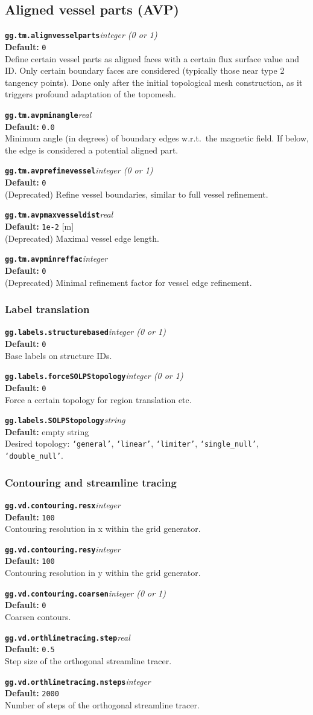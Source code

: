 \documentclass[10pt,a4paper]{article}
\newcommand{\sw}[4]{%
  \par\vspace{0.7em}%
  \begin{minipage}{\linewidth}\raggedright
    \textbf{\texttt{#1}}\hfill\textit{#2}\\[0.1em]
    \textbf{Default:} #3\\[0.1em]
    #4\par
    \vspace{0.3em}{\color{swgrey}\hrule}
  \end{minipage}\par}
\begin{document}
\subsection*{Aligned vessel parts (AVP)}
\sw{gg.tm.alignvesselparts}{integer (0 or 1)}{\texttt{0}}{Define certain vessel parts as aligned faces with a certain flux surface value and ID. Only certain boundary faces are considered (typically those near type 2 tangency points). Done only after the initial topological mesh construction, as it triggers profound adaptation of the topomesh.}
\sw{gg.tm.avpminangle}{real}{\texttt{0.0}}{Minimum angle (in degrees) of boundary edges w.r.t.\ the magnetic field. If below, the edge is considered a potential aligned part.}
\sw{gg.tm.avprefinevessel}{integer (0 or 1)}{\texttt{0}}{(Deprecated) Refine vessel boundaries, similar to full vessel refinement.}
\sw{gg.tm.avpmaxvesseldist}{real}{\texttt{1e-2} [m]}{(Deprecated) Maximal vessel edge length.}
\sw{gg.tm.avpminreffac}{integer}{\texttt{0}}{(Deprecated) Minimal refinement factor for vessel edge refinement.}

\subsubsection*{Label translation}
\sw{gg.labels.structurebased}{integer (0 or 1)}{\texttt{0}}{Base labels on structure IDs.}
\sw{gg.labels.forceSOLPStopology}{integer (0 or 1)}{\texttt{0}}{Force a certain topology for region translation etc.}
\sw{gg.labels.SOLPStopology}{string}{empty string}{Desired topology: \texttt{`general'}, \texttt{`linear'}, \texttt{`limiter'}, \texttt{`single\_null'}, \texttt{`double\_null'}.}

\subsubsection*{Contouring and streamline tracing}
\sw{gg.vd.contouring.resx}{integer}{\texttt{100}}{Contouring resolution in x within the grid generator.}
\sw{gg.vd.contouring.resy}{integer}{\texttt{100}}{Contouring resolution in y within the grid generator.}
\sw{gg.vd.contouring.coarsen}{integer (0 or 1)}{\texttt{0}}{Coarsen contours.}
\sw{gg.vd.orthlinetracing.step}{real}{\texttt{0.5}}{Step size of the orthogonal streamline tracer.}
\sw{gg.vd.orthlinetracing.nsteps}{integer}{\texttt{2000}}{Number of steps of the orthogonal streamline tracer.}
\end{document}

